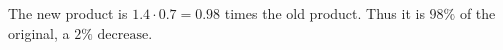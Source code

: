 The new product is $1.4\cdot0.7=0.98$ times the old product. Thus it is $98\%$ of the original, a $\boxed{2\%\text{ decrease}}$.
